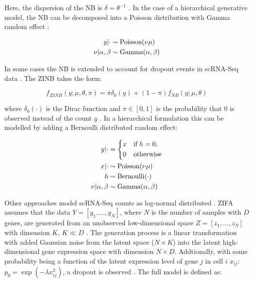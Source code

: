 Here, the dispersion of the NB is $\delta=\theta^{-1}$ \cite{Risso2018}. In the case of a hierarchical generative model, the NB can be decomposed into a Poisson distribution with Gamma random effect \cite{Vallejos2015BASiCS}:

\begin{align*}
y|\cdot&\sim{}\textnormal{Poisson}(\nu\mu)\\
\nu|\alpha,\beta&\sim{}\textnormal{Gamma}(\alpha,\beta)
\end{align*}

In some cases \citep{Risso2018, Lopez2018} the NB is extended to account for dropout events in scRNA-Seq data \citep{Kharchenko2015}. The \gls{ZINB} takes the form:

\begin{equation}
f_{ZINB}(y;\mu,\theta,\pi)=\pi\delta_0(y) + (1-\pi)f_{NB}(y;\mu,\theta) 
\end{equation}

where $\delta_0(\cdot)$ is the Dirac function and $\pi\in[0,1]$ is the probability that 0 is observed instead of the count $y$ \citep{Risso2018}. In a hierarchical formulation this can be modelled by adding a Bernoulli distributed random effect:

\begin{align*}
y|\cdot & = 
 \left\lbrace
  \begin{aligned}
    & x && \textnormal{if} \; h = 0,  \\ 
    & 0 && \textnormal{otherwise}    	    
  \end{aligned}
\right.\\
x|\cdot&\sim{}\textnormal{Poisson}(\nu\mu)\\
h & \sim \textnormal{Bernoulli}(\cdot)\\
\nu|\alpha,\beta&\sim{}\textnormal{Gamma}(\alpha,\beta)
\end{align*}

Other approaches model scRNA-Seq counts as log-normal distributed \citep{Azizi2017,Pierson2015}. \Gls{ZIFA} assumes that the data $Y=[y_1,...,y_N]$, where $N$ is the number of samples with $D$ genes, are generated from an unobserved low-dimensional space $Z=[z_1,...,z_N]$ with dimension $K,\,{}K\ll{}D$ \citep{Pierson2015}. The generation process is a linear transformation with added Gaussian noise from the latent space ($N\times{}K$) into the latent high-dimensional gene expression space with dimension $N\times{}D$. Addtionally, with some probability being a function of the latent expression level of gene $j$ in cell $i$ $x_{ij}$: $p_0=\exp(-\lambda{}x_{ij}^2)$, a dropout is observed \citep{Pierson2015}. The full model is defined as:

